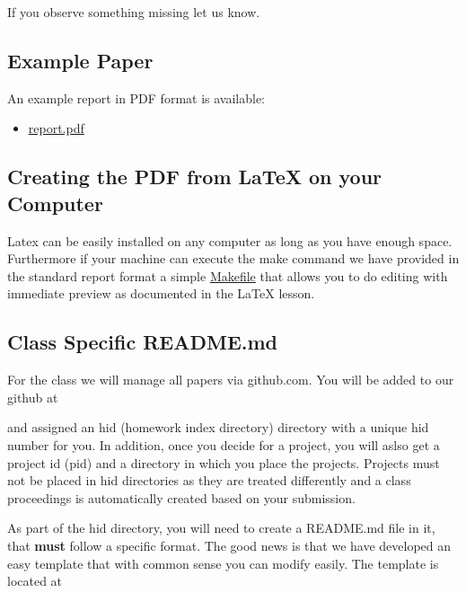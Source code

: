 If you observe something missing let us know.

\subsection{Example Paper}\label{example-paper}

An example report in PDF format is available:

\begin{itemize}

\item
  \href{https://github.com/cloudmesh/classes/blob/master/docs/source/format/report/latex/report.pdf}{report.pdf}
\end{itemize}

\subsection{Creating the PDF from LaTeX on your
Computer}\label{creating-the-pdf-from-latex-on-your-computer}

Latex can be easily installed on any computer as long as you have
enough space. Furthermore if your machine can execute the make command
we have provided in the standard report format a simple
\href{https://github.com/cloudmesh/classes/blob/master/docs/source/format/report/latex/Makefile}{Makefile}
that allows you to do editing with immediate preview as documented in
the LaTeX lesson.

\subsection{Class Specific README.md}\label{class-specific-readme.md}

For the class we will manage all papers via github.com. You will be
added to our github at


and assigned an hid (homework index directory) directory with a unique
hid number for you. In addition, once you decide for a project, you will
aslso get a project id (pid) and a directory in which you place the
projects. Projects must not be placed in hid directories as they are
treated differently and a class proceedings is automatically created
based on your submission.

As part of the hid directory, you will need to create a README.md file
in it, that \textbf{must} follow a specific format. The good news is
that we have developed an easy template that with common sense you can
modify easily. The template is located at


